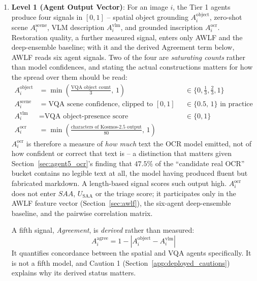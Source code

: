 \documentclass[12pt,a4paper]{report}
\begin{document}
\begin{enumerate}
    \item \textbf{Level 1 (Agent Output Vector)}: For an image $i$, the Tier 1 agents produce four signals in $[0,1]$ -- spatial object grounding $A_i^{\text{object}}$, zero-shot scene $A_i^{\text{scene}}$, VLM description $A_i^{\text{vlm}}$, and grounded inscription $A_i^{\text{ocr}}$. Restoration quality, a further measured signal, enters only AWLF and the deep-ensemble baseline; with it and the derived Agreement term below, AWLF reads six agent signals. Two of the four are \emph{saturating counts} rather than model confidences, and stating the actual constructions matters for how the spread over them should be read:
\begin{equation*}
\begin{aligned}
A_i^{\text{object}} &= \min\!\left(\tfrac{\text{VQA object count}}{3},\, 1\right) && \in \{0,\tfrac13,\tfrac23,1\} \\
A_i^{\text{scene}}  &= \text{VQA scene confidence, clipped to } [0,1] && \in \{0.5,\,1\} \text{ in practice} \\
A_i^{\text{vlm}}    &= \text{VQA object-presence score} && \in \{0,1\} \\
A_i^{\text{ocr}}    &= \min\!\left(\tfrac{\text{characters of Kosmos-2.5 output}}{80},\, 1\right) &&
\end{aligned}
\end{equation*}
$A_i^{\text{ocr}}$ is therefore a measure of \emph{how much} text the OCR model emitted, not of how confident or correct that text is -- a distinction that matters given Section~\ref{sec:agent5_ocr}'s finding that $47.5\%$ of the ``candidate real OCR'' bucket contains no legible text at all, the model having produced fluent but fabricated markdown. A length-based signal scores such output high. $A_i^{\text{ocr}}$ does not enter $SAA$, $U_{\text{SAA}}$ or the triage score; it participates only in the AWLF feature vector (Section~\ref{sec:awlf}), the six-agent deep-ensemble baseline, and the pairwise correlation matrix. 

A fifth signal, \textit{Agreement}, is \emph{derived} rather than measured:
    \begin{equation}
        A_i^{\text{agree}} = 1 - \left|A_i^{\text{object}} - A_i^{\text{vlm}}\right|
        \label{eq:agree}
    \end{equation}
    It quantifies concordance between the spatial and VQA agents specifically. It is not a fifth model, and Caution 1 (Section~\ref{app:deployed_cautions}) explains why its derived status matters.


\end{enumerate}
\end{document}
